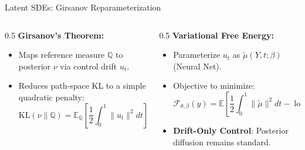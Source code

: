 \documentclass{beamer}
\begin{document}
\begin{frame}{Latent SDEs: Girsanov Reparameterization}
    \centering
    \vfill
    
    \vspace{0.6cm}
    \begin{columns}[t]
        \begin{column}{0.5\textwidth}
            \textbf{Girsanov's Theorem:}
            \begin{itemize}
                \item Maps reference measure $\mathbb{Q}$ to posterior $\nu$ via control drift $u_t$.
                \item Reduces path-space KL to a simple quadratic penalty:
                \[ \text{KL}(\nu \parallel \mathbb{Q}) = \mathbb{E}_{\mathbb{Q}} \left[ \frac{1}{2} \int_0^1 \|u_t\|^2 dt \right] \]
            \end{itemize}
        \end{column}
        
        \begin{column}{0.5\textwidth}
            \textbf{Variational Free Energy:}
            \begin{itemize}
                \item Parameterize $u_t$ as $\tilde{\mu}(Y, t; \beta)$ (Neural Net).
                \item Objective to minimize:
                \[ \mathcal{F}_{\theta, \beta}(y) = \mathbb{E} \left[ \frac{1}{2}\int_0^1 \|\tilde{\mu}\|^2 dt - \log \mathbb{P}_\theta[y \mid Z_1] \right] \]
                \item \textbf{Drift-Only Control}: Posterior diffusion remains standard.
            \end{itemize}
        \end{column}
    \end{columns}
    \vfill
\end{frame}
\end{document}
